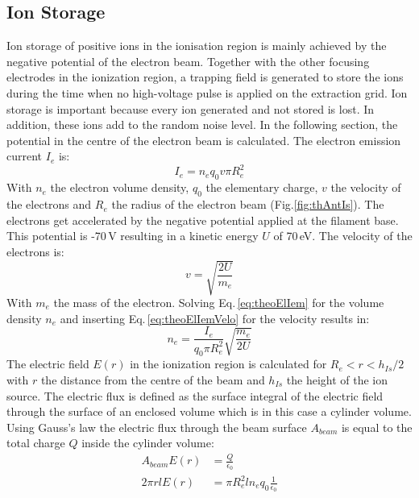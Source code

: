 	\subsection{Ion Storage }\label{chap:IonStor}
	Ion storage of positive ions in the ionisation region is mainly achieved by the negative potential of the electron beam. Together with the other focusing electrodes in the ionization region, a trapping field is generated to store the ions during the time when no high-voltage pulse is applied on the extraction grid. Ion storage is important because every ion generated and not stored is lost. In addition, these ions add to the random noise level. In the following section, the potential in the centre of the electron beam is calculated. The electron emission current $I_{e}$ is:
	\begin{equation}
		I_{e} = n_e q_0 v\pi R_e^2
		\label{eq:theoElIem}
	\end{equation}
	With $n_e$ the electron volume density, $q_0$ the elementary charge, $v$ the velocity of the electrons and $R_e$ the radius of the electron beam (Fig.\ref{fig:thAntIs}). The electrons get accelerated by the negative potential applied at the filament base. This potential is -70\,\si{\volt} resulting in a kinetic energy $U$ of 70\,\si{\electronvolt}. The velocity of the electrons is:
	\begin{equation}
		v = \sqrt{\frac{2 U}{m_e}}
		\label{eq:theoElIemVelo}
	\end{equation}
	With $m_e$ the mass of the electron. Solving Eq.\,\eqref{eq:theoElIem} for the volume density $n_e$ and inserting Eq.\,\eqref{eq:theoElIemVelo} for the velocity results in:
	\begin{equation}
		n_e = \frac{I_e}{q_0 \pi R_e^2}\sqrt{\frac{m_e}{2U}}						\label{eq:theoElIemNe}
	\end{equation}
	The electric field $E(r)$ in the ionization region is calculated for $R_e<r<h_{Is}/2$ with $r$ the distance from the centre of the beam and $h_{Is}$ the height of the ion source. The electric flux is defined as the surface integral of the electric field through the surface of an enclosed volume which is in this case a cylinder volume. Using Gauss's law the electric flux through the beam surface $A_{beam}$ is equal to the total charge $Q$ inside the cylinder volume:
	\begin{align}
		A_{beam} E(r) &= \frac{Q}{\epsilon_0}\\
		2\pi r l E(r) &= \pi R_e^2 l n_e q_0 \frac{1}{\epsilon_0}
	\end{align}
